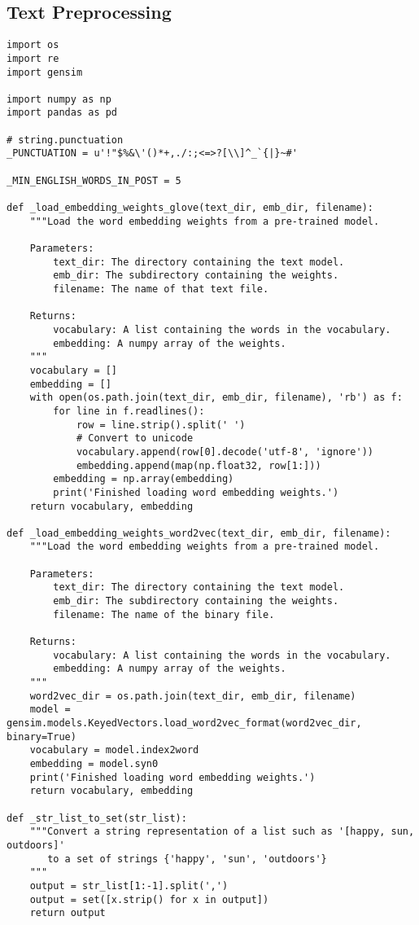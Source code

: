 \subsection{Text Preprocessing}
\begin{lstlisting}
import os
import re
import gensim

import numpy as np
import pandas as pd

# string.punctuation
_PUNCTUATION = u'!"$%&\'()*+,./:;<=>?[\\]^_`{|}~#'

_MIN_ENGLISH_WORDS_IN_POST = 5

def _load_embedding_weights_glove(text_dir, emb_dir, filename):
    """Load the word embedding weights from a pre-trained model.
    
    Parameters:
        text_dir: The directory containing the text model.
        emb_dir: The subdirectory containing the weights.
        filename: The name of that text file.
        
    Returns:
        vocabulary: A list containing the words in the vocabulary.
        embedding: A numpy array of the weights.
    """
    vocabulary = []
    embedding = []
    with open(os.path.join(text_dir, emb_dir, filename), 'rb') as f:
        for line in f.readlines():
            row = line.strip().split(' ')
            # Convert to unicode
            vocabulary.append(row[0].decode('utf-8', 'ignore'))
            embedding.append(map(np.float32, row[1:]))
        embedding = np.array(embedding)
        print('Finished loading word embedding weights.')
    return vocabulary, embedding

def _load_embedding_weights_word2vec(text_dir, emb_dir, filename):
    """Load the word embedding weights from a pre-trained model.
    
    Parameters:
        text_dir: The directory containing the text model.
        emb_dir: The subdirectory containing the weights.
        filename: The name of the binary file.
        
    Returns:
        vocabulary: A list containing the words in the vocabulary.
        embedding: A numpy array of the weights.
    """
    word2vec_dir = os.path.join(text_dir, emb_dir, filename)
    model = gensim.models.KeyedVectors.load_word2vec_format(word2vec_dir, binary=True)
    vocabulary = model.index2word
    embedding = model.syn0
    print('Finished loading word embedding weights.')
    return vocabulary, embedding

def _str_list_to_set(str_list):
    """Convert a string representation of a list such as '[happy, sun, outdoors]'
       to a set of strings {'happy', 'sun', 'outdoors'}
    """
    output = str_list[1:-1].split(',')
    output = set([x.strip() for x in output])
    return output


\end{lstlisting}
